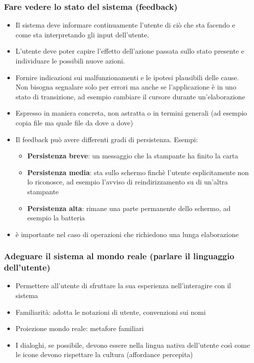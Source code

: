 \documentclass[11pt,a4paper]{book}
\begin{document}
\subsubsection{Fare vedere lo stato del sistema (feedback)}
\begin{itemize}
	\item Il sistema deve informare continuamente l'utente di ciò che sta facendo e come sta interpretando gli input dell'utente.
	\item L'utente deve poter capire l'effetto dell'azione passata sullo stato presente e individuare le possibili nuove azioni.
	\item Fornire indicazioni sui malfunzionamenti e le ipotesi plausibili delle cause. Non bisogna segnalare solo per errori ma anche se l'applicazione è in uno stato di transizione, ad esempio cambiare il cursore durante un'elaborazione
	\item Espresso in maniera concreta, non astratta o in termini generali (ad esempio copia file ma quale file da dove a dove)
	\item Il feedback può avere differenti gradi di persistenza. Esempi:
	\begin{itemize}
		\item \textbf{Persistenza breve}: un messaggio che la stampante ha finito la carta
		\item \textbf{Persistenza media}: sta sullo schermo finchè l'utente esplicitamente non lo riconosce, ad esempio l'avviso di reindirizzamento su di un'altra stampante
		\item \textbf{Persistenza alta}: rimane una parte permanente dello schermo, ad esempio la batteria
	\end{itemize}
	\item è importante nel caso di operazioni che richiedono una lunga elaborazione
\end{itemize}

\subsubsection{Adeguare il sistema al mondo reale (parlare il linguaggio dell'utente)}
\begin{itemize}
	\item Permettere all'utente di sfruttare la sua esperienza nell'interagire con il sistema
	\item Familiarità: adotta le notazioni di utente, convenzioni sui nomi
	\item Proiezione mondo reale: metafore familiari
	\item I dialoghi, se possibile, devono essere nella lingua nativa dell'utente così come le icone devono rispettare la cultura (affordance percepita)
\end{itemize} 
\end{document}
